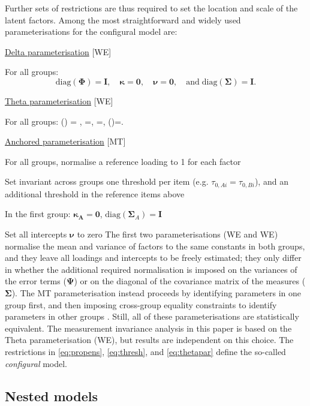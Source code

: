 Further sets of restrictions are thus required to set the location and scale of the latent factors. Among the most straightforward and widely used parameterisations for the configural model are:
\bi[label=$\diamond$]
\item \underline{Delta parameterisation} {[WE{\textDelta}]} \citep{Wu2016a}

For all groups: $$\text{diag}(\bm{\Phi}) = \bm{I}, \quad \bm{\kappa}=\bm{0}, \quad \bm{\nu}=\bm{0}, \quad \text{and} \; \text{diag}(\bm{\Sigma})=\bm{I}.$$

\item \underline{Theta parameterisation} {[WE{\textTheta}]} \citep{Wu2016a}

For all groups: 
\be\label{eq:thetapar}
(\bm{\Phi}) = , \quad \bm{\kappa}=, \quad \bm{\nu}=, \quad {} \; (\bm{\Psi})=.
\ee

\item \underline{Anchored parameterisation} {[MT]} \citep{Millsap2004}
  \bi
  \item For all groups, normalise a reference loading to 1 for each factor
  \item Set invariant across groups one threshold per item (e.g. $\tau_{0,Ai} = \tau_{0,Bi}$), and an additional threshold in the reference items above
  \item In the first group: $\bm{\kappa_A}=\bm{0}$, $\text{diag}(\bm{\Sigma}_A)=\bm{I}$
  \item Set all intercepts $\bm{\nu}$ to zero
  \ei
\ei
The first two parameterisations (WE{\textDelta} and WE{\textTheta}) normalise the mean and variance of factors to the same constants in both groups, and they leave all loadings and intercepts to be freely estimated; they only differ in whether the additional required normalisation is imposed on the variances of the error terms ($\bm{\Psi}$) or on the diagonal of the covariance matrix of the measures ($\bm{\Sigma}$). The MT parameterisation instead proceeds by identifying parameters in one group first, and then imposing cross-group equality constraints to identify parameters in other groups \citep{Wu2016a}. Still, all of these parameterisations are statistically equivalent. The measurement invariance analysis in this paper is based on the Theta parameterisation (WE{\textTheta}), but results are independent on this choice. The restrictions in \eqref{eq:propens}, \eqref{eq:thresh}, and \eqref{eq:thetapar} define the so-called \emph{configural} model.


\subsection{Nested models \label{sec:nested}}

